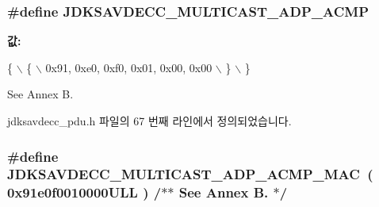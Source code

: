 \subsubsection[{\texorpdfstring{J\+D\+K\+S\+A\+V\+D\+E\+C\+C\+\_\+\+M\+U\+L\+T\+I\+C\+A\+S\+T\+\_\+\+A\+D\+P\+\_\+\+A\+C\+MP}{JDKSAVDECC_MULTICAST_ADP_ACMP}}]{\setlength{\rightskip}{0pt plus 5cm}\#define J\+D\+K\+S\+A\+V\+D\+E\+C\+C\+\_\+\+M\+U\+L\+T\+I\+C\+A\+S\+T\+\_\+\+A\+D\+P\+\_\+\+A\+C\+MP}\hypertarget{group__pdu_ga654d40062a44a48e7250fd35fd45639a}{}\label{group__pdu_ga654d40062a44a48e7250fd35fd45639a}
{\bfseries 값\+:}
\begin{DoxyCode}
\{                                                                                                          
                      \(\backslash\)
        \{                                                                                                  
                          \(\backslash\)
            0x91, 0xe0, 0xf0, 0x01, 0x00, 0x00                                                             
                          \(\backslash\)
        \}                                                                                                  
                          \(\backslash\)
    \}
\end{DoxyCode}
See Annex B. 

jdksavdecc\+\_\+pdu.\+h 파일의 67 번째 라인에서 정의되었습니다.

\subsubsection[{\texorpdfstring{J\+D\+K\+S\+A\+V\+D\+E\+C\+C\+\_\+\+M\+U\+L\+T\+I\+C\+A\+S\+T\+\_\+\+A\+D\+P\+\_\+\+A\+C\+M\+P\+\_\+\+M\+AC}{JDKSAVDECC_MULTICAST_ADP_ACMP_MAC}}]{\setlength{\rightskip}{0pt plus 5cm}\#define J\+D\+K\+S\+A\+V\+D\+E\+C\+C\+\_\+\+M\+U\+L\+T\+I\+C\+A\+S\+T\+\_\+\+A\+D\+P\+\_\+\+A\+C\+M\+P\+\_\+\+M\+AC~( 0x91e0f0010000\+U\+L\+L )       /$\ast$$\ast$ See Annex B. $\ast$/}\hypertarget{group__pdu_ga5445de40452536f7cf64bd83c081ce0f}{}\label{group__pdu_ga5445de40452536f7cf64bd83c081ce0f}


